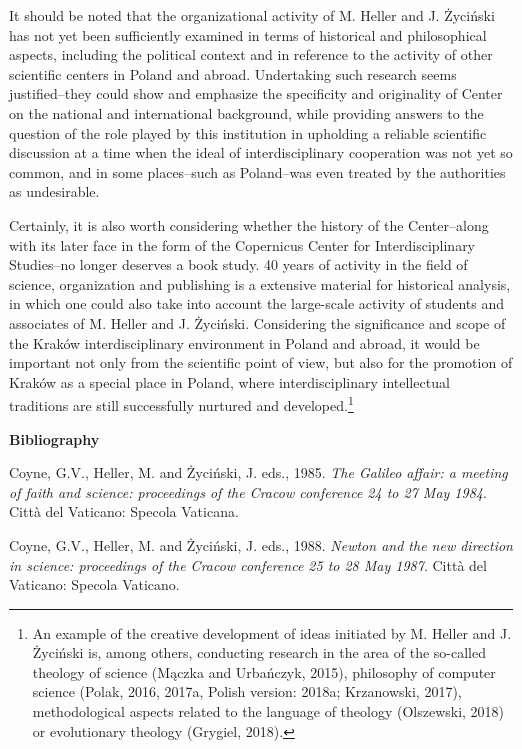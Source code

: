 \documentclass[a4paper]{article}
\begin{document}
It should be noted that the organizational activity of M. Heller and J. Życiński has not yet been sufficiently examined
in terms of historical and philosophical aspects, including the political context and in reference to the activity of
other scientific centers in Poland and abroad. Undertaking such research seems justified–they could show and emphasize
the specificity and originality of Center on the national and international background, while providing answers to the
question of the role played by this institution in upholding a reliable scientific discussion at a time when the ideal
of interdisciplinary cooperation was not yet so common, and in some places–such as Poland–was even treated by the
authorities as undesirable.

Certainly, it is also worth considering whether the history of the Center–along with its later face in the form of the
Copernicus Center for Interdisciplinary Studies–no longer deserves a book study. 40 years of activity in the field of
science, organization and publishing is a extensive material for historical analysis, in which one could also take into
account the large-scale activity of students and associates of M. Heller and J. Życiński. Considering the significance
and scope of the Kraków interdisciplinary environment in Poland and abroad, it would be important not only from the
scientific point of view, but also for the promotion of Kraków as a special place in Poland, where interdisciplinary
intellectual traditions are still successfully nurtured and developed.\footnote{ An example of the creative development
of ideas initiated by M. Heller and J. Życiński is, among others, conducting research in the area of the so-called
theology of science \label{ref:RNDhmsjYwLHIc}(Mączka and Urbańczyk, 2015), philosophy of computer science
\label{ref:RNDc93TU9FMDO}(Polak, 2016, 2017a, Polish version: 2018a; Krzanowski, 2017), methodological aspects related
to the language of theology \label{ref:RNDFqYwOGV4Gx}(Olszewski, 2018) or evolutionary theology
\label{ref:RNDEOZ5nLNd0h}(Grygiel, 2018).}

{\bfseries
Bibliography}

Coyne, G.V., Heller, M. and Życiński, J. eds., 1985. \textit{The Galileo affair: a meeting of faith and science:
proceedings of the Cracow conference 24 to 27 May 1984}. Città del Vaticano: Specola Vaticana.

Coyne, G.V., Heller, M. and Życiński, J. eds., 1988. \textit{Newton and the new direction in science: proceedings of the
Cracow conference 25 to 28 May 1987}. Città del Vaticano: Specola Vaticano.
\end{document}
